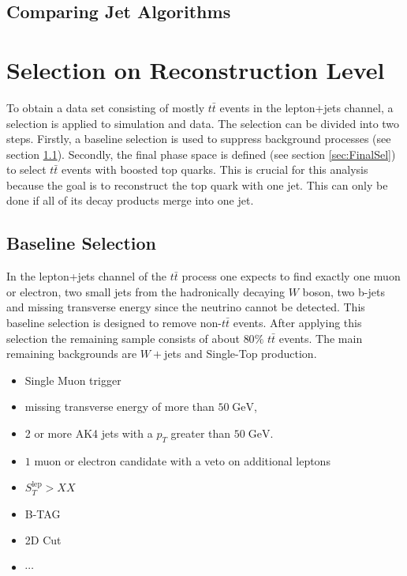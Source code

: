 \subsection{Comparing Jet Algorithms}

\section{Selection on Reconstruction Level}
\label{sec:selection}
	To obtain a data set consisting of mostly $t\bar{t}$ events in the lepton+jets channel, a selection is applied to simulation and data. The selection can be divided into two steps. Firstly, a baseline selection is used to suppress background processes (see section \ref{sec:PreSel}). Secondly, the final phase space is defined (see section \ref{sec:FinalSel}) to select $t\bar{t}$ events with boosted top quarks. This is crucial for this analysis because the goal is to reconstruct the top quark with one jet. This can only be done if all of its decay products merge into one jet.
\subsection{Baseline Selection}
\label{sec:PreSel}
	In the lepton+jets channel of the $t\bar{t}$ process one expects to find exactly one muon or electron, two small jets from the hadronically decaying $W$ boson, two b-jets and missing transverse energy since the neutrino cannot be detected. This baseline selection is designed to remove non-$t\bar{t}$ events. After applying this selection the remaining sample consists of about $80\%$ $t\bar{t}$ events. The main remaining backgrounds are $W+$jets and Single-Top production. 
	\begin{itemize}
	\item Single Muon trigger 
	\item missing transverse energy of more than $50\;\text{GeV}$,
	\item 2 or more AK4 jets with a $p_T$ greater than $50\;\text{GeV}$.
	\item $1$ muon or electron candidate with a veto on additional leptons
	\item $S_T^\text{lep} > XX$
	\item B-TAG
	\item 2D Cut
	\item $\cdots$	
	\end{itemize}
	
